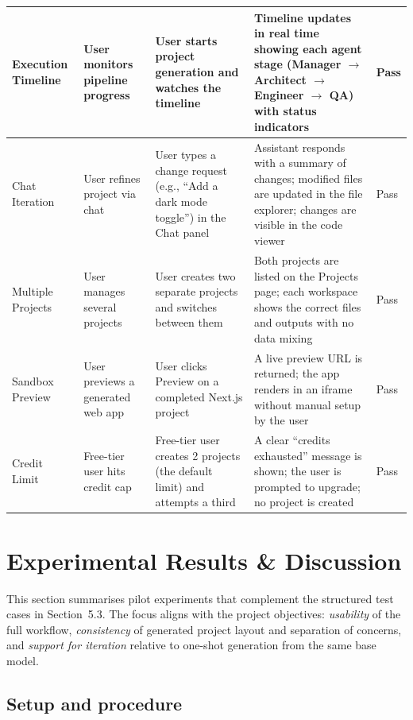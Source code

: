 \begin{longtable}{|p{3.2cm}|p{3.6cm}|p{3.6cm}|p{4.0cm}|>{\centering\arraybackslash}p{1.6cm}|}
\hline
Execution Timeline & User monitors pipeline progress & User starts project generation and watches the timeline & Timeline updates in real time showing each agent stage (Manager $\rightarrow$ Architect $\rightarrow$ Engineer $\rightarrow$ QA) with status indicators & Pass \\
\hline
Chat Iteration & User refines project via chat & User types a change request (e.g., ``Add a dark mode toggle'') in the Chat panel & Assistant responds with a summary of changes; modified files are updated in the file explorer; changes are visible in the code viewer & Pass \\
\hline
Multiple Projects & User manages several projects & User creates two separate projects and switches between them & Both projects are listed on the Projects page; each workspace shows the correct files and outputs with no data mixing & Pass \\
\hline
Sandbox Preview & User previews a generated web app & User clicks Preview on a completed Next.js project & A live preview URL is returned; the app renders in an iframe without manual setup by the user & Pass \\
\hline
Credit Limit & Free-tier user hits credit cap & Free-tier user creates 2 projects (the default limit) and attempts a third & A clear ``credits exhausted'' message is shown; the user is prompted to upgrade; no project is created & Pass \\
\hline
\end{longtable}

\section{Experimental Results \& Discussion}

This section summarises pilot experiments that complement the structured test cases in Section~5.3. The focus aligns with the project objectives: \emph{usability} of the full workflow, \emph{consistency} of generated project layout and separation of concerns, and \emph{support for iteration} relative to one-shot generation from the same base model.

\subsection{Setup and procedure}

